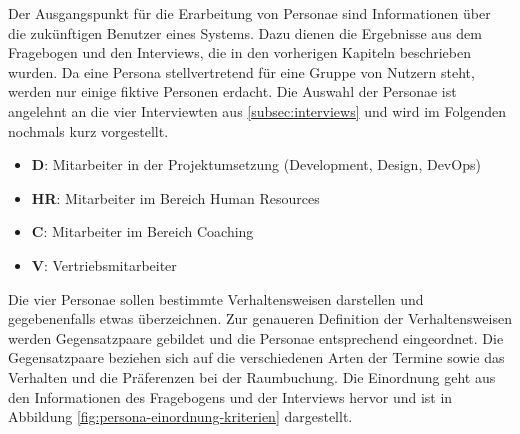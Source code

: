 Der Ausgangspunkt für die Erarbeitung von Personae sind Informationen über die zukünftigen Benutzer eines Systems. Dazu dienen die Ergebnisse aus dem Fragebogen und den Interviews, die in den vorherigen Kapiteln beschrieben wurden. Da eine Persona stellvertretend für eine Gruppe von Nutzern steht, werden nur einige fiktive Personen erdacht. Die Auswahl der Personae ist angelehnt an die vier Interviewten aus \ref{subsec:interviews} und wird im Folgenden nochmals kurz vorgestellt. 

\begin{itemize}
    \item \textbf{D}: Mitarbeiter in der Projektumsetzung (Development, Design, DevOps)
    \item \textbf{HR}: Mitarbeiter im Bereich Human Resources
    \item \textbf{C}: Mitarbeiter im Bereich Coaching
    \item \textbf{V}: Vertriebsmitarbeiter
\end{itemize}

Die vier Personae sollen bestimmte Verhaltensweisen darstellen und gegebenenfalls etwas überzeichnen. Zur genaueren Definition der Verhaltensweisen werden Gegensatzpaare gebildet und die Personae entsprechend eingeordnet. Die Gegensatzpaare beziehen sich auf die verschiedenen Arten der Termine sowie das Verhalten und die Präferenzen bei der Raumbuchung. Die Einordnung geht aus den Informationen des Fragebogens und der Interviews hervor und ist in Abbildung \ref{fig:persona-einordnung-kriterien} dargestellt. 
\newline

